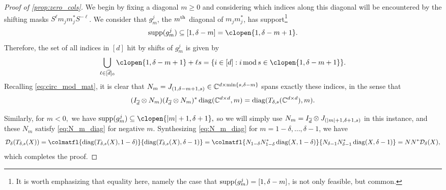\begin{proof}[Proof of \cref{prop:zero_cols}]
  We begin by fixing a diagonal $m \ge 0$ and considering which indices along this diagonal will be encountered by the shifting masks $S^\ell m_j m_j^* S^{-\ell}$.  We consider that $g_m^j$, the $m^{\text{th}}$ diagonal of $m_j m_j^*$, has support\footnote{It is worth emphasizing that equality here, namely the case that $\operatorname{supp}(g_m^j) = [1, \delta - m]$, is not only feasible, but common.} \[\supp(g_m^j) \subset [1, \delta - m] = \clopen{1, \delta - m + 1}.\]   Therefore, the set of all indices in $[d]$ hit by shifts of $g_m^j$ is given by \[\bigcup_{\ell \in [\dbar]_0} \clopen{1, \delta - m + 1} + \ell s = \{i \in [d] : i \mod s \in \clopen{1, \delta - m + 1}\}.\]  Recalling \eqref{eq:circ_mod_mat}, it is clear that $N_m = J_{(1, \delta - m + 1, s)} \in \mathbb{C}^{d \times \min\{s, \delta - m\}}$ spans exactly these indices, in the sense that \begin{equation} \label{eq:N_m_diag} (I_{\overline{d}} \otimes N_m) (I_{\overline{d}} \otimes N_m)^* \operatorname{diag}(\mathbb{C}^{d \times d}, m) = \operatorname{diag}(T_{\delta, s}(\mathbb{C}^{d \times d}), m). \end{equation}

  Similarly, for $m < 0,$ we have $\supp(g_m^j) \subset \clopen{\abs{m} + 1, \delta + 1},$ so we will simply use $N_m = I_{\overline{d}} \otimes J_{(\lvert m\rvert + 1, \delta + 1, s)}$ in this instance, and these $N_m$ satisfy \eqref{eq:N_m_diag} for negative $m$.  Synthesizing \eqref{eq:N_m_diag} for $m = 1 - \delta, \ldots, \delta - 1$, we have \[\Dc_\delta(T_{\delta, s}(X)) = \colmatfl{\diag(T_{\delta, s}(X), 1 - \delta)}{\diag(T_{\delta, s}(X), \delta - 1)} = \colmatfl{N_{1 - \delta} N_{1 - \delta}^* \diag(X, 1 - \delta)}{N_{\delta - 1} N_{\delta - 1}^* \diag(X, \delta - 1)} = N N^* \Dc_\delta(X),\] which completes the proof.
\end{proof}

